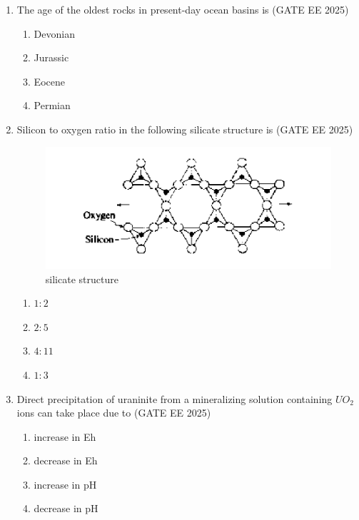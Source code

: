\documentclass[journal]{IEEEtran}
\begin{document}
\begin{enumerate}[start=1]
\begin{enumerate}
\end{enumerate}

\item The age of the oldest rocks in present-day ocean basins is
\hfill{(GATE EE 2025)}
\begin{enumerate}
    \item Devonian
    \item Jurassic
    \item Eocene
    \item Permian
\end{enumerate}
\item Silicon to oxygen ratio in the following silicate structure is
\hfill{(GATE EE 2025)}
\begin{figure}[H]
    \centering
    \includegraphics[width=0.5\linewidth]{figs/Screenshot from 2025-08-05 22-06-18.png}
    \caption{silicate structure}
    \label{fig:silicate}
\end{figure}
\begin{enumerate}
    \item $1:2$
    \item $2:5$
    \item $4:11$
    \item $1:3$
\end{enumerate}

\item Direct precipitation of uraninite from a mineralizing solution containing  $UO_2$ions can take place due to
\hfill{(GATE EE 2025)}
\begin{enumerate}
    \item increase in Eh
    \item decrease in Eh
    \item increase in pH
    \item  decrease in pH
\end{enumerate}


\end{enumerate}
\end{document}
